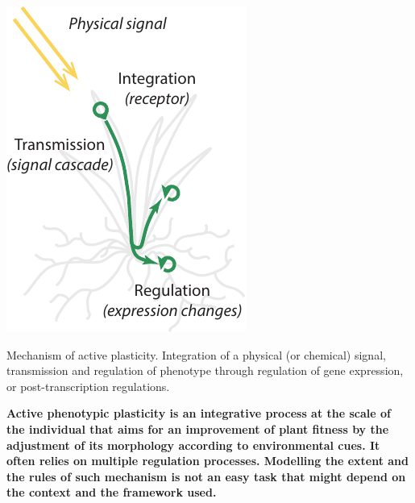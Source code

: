 {\begin{marginfigure}
    \includegraphics[width=1\linewidth]{./Figures/active_plasticity_m.pdf}
  \caption[Active plasticity]{Mechanism of active plasticity. Integration of a physical (or chemical) signal, transmission and regulation of phenotype through regulation of gene expression, or post-transcription regulations.}
  \label{fig:active_plasticity}
\end{marginfigure}

\textbf{Active phenotypic plasticity is an integrative process at the scale of the individual that aims for an improvement of plant fitness by the adjustment of its morphology according to environmental cues. It often relies on multiple regulation processes. Modelling the extent and the rules of such mechanism is not an easy task that might depend on the context and the framework used.}

}
